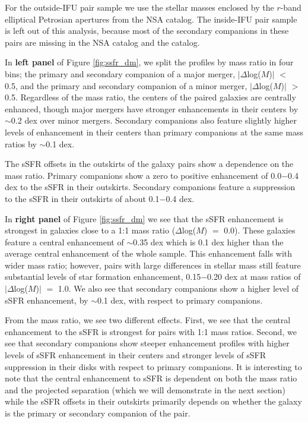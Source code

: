 \documentclass[iop,revtex4,twocolumn,apj,numberedappendix,appendixfloats]{emulateapj}
\begin{document}

For the outside-IFU pair sample we use the stellar masses enclosed by the $r$-band elliptical Petrosian apertures from the NSA catalog. The inside-IFU pair sample is left out of this analysis, because most of the secondary companions in these pairs are missing in the NSA catalog and the \citet{Simard:2011} catalog.

In \textbf{left panel} of Figure \ref{fig:ssfr_dm}, we split the profiles by mass ratio in four bins; the primary and secondary companion of a major merger, $|\Delta$log($M$)$|$ $<$ 0.5, and the primary and secondary companion of a minor merger, $|\Delta$log($M$)$|$ $>$ 0.5. Regardless of the mass ratio, the centers of the paired galaxies are centrally enhanced, though major mergers have stronger enhancements in their centers by $\sim$0.2 dex over minor mergers. Secondary companions also feature slightly higher levels of enhancement in their centers than primary companions at the same mass ratios by $\sim$0.1 dex. 

The sSFR offsets in the outskirts of the galaxy pairs show a dependence on the mass ratio. Primary companions show a zero to positive enhancement of 0.0$-$0.4 dex to the sSFR in their outskirts. Secondary companions feature a suppression to the sSFR in their outskirts of about 0.1$-$0.4 dex. 

In \textbf{right panel} of Figure \ref{fig:ssfr_dm} we see that the sSFR enhancement is strongest in galaxies close to a 1:1 mass ratio ($\Delta$log($M$) $=$ 0.0). These galaxies feature a central enhancement of $\sim$0.35 dex which is 0.1 dex higher than the average central enhancement of the whole sample. This enhancement falls with wider mass ratio; however, pairs with large differences in stellar mass still feature substantial levels of star formation enhancement, 0.15$-$0.20 dex at mass ratios of $|\Delta$log($M$)$|$ $=$ 1.0. We also see that secondary companions show a higher level of sSFR enhancement, by $\sim$0.1 dex, with respect to primary companions. 

From the mass ratio, we see two different effects. First, we see that the central enhancement to the sSFR is strongest for pairs with 1:1 mass ratios. Second, we see that secondary companions show steeper enhancement profiles with higher levels of sSFR enhancement in their centers and stronger levels of sSFR suppression in their disks with respect to primary companions. It is interesting to note that the central enhancement to sSFR is dependent on both the mass ratio and the projected separation (which we will demonstrate in the next section) while the sSFR offsets in their outskirts primarily depends on whether the galaxy is the primary or secondary companion of the pair.
\end{document}
